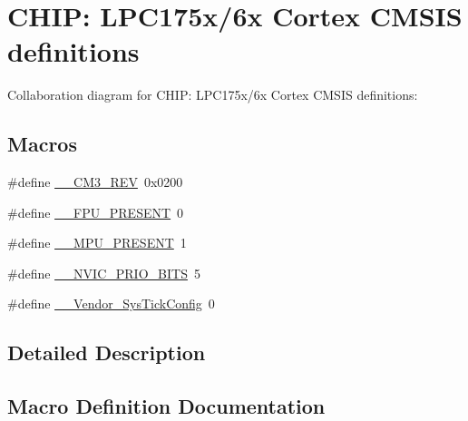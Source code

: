\hypertarget{group__CMSIS__175X__6X__COMMON}{}\section{C\+H\+IP\+: L\+P\+C175x/6x Cortex C\+M\+S\+IS definitions}
\label{group__CMSIS__175X__6X__COMMON}
Collaboration diagram for C\+H\+IP\+: L\+P\+C175x/6x Cortex C\+M\+S\+IS definitions\+:
\subsection*{Macros}
\begin{DoxyCompactItemize}
\item 
\#define \hyperlink{group__CMSIS__175X__6X__COMMON_gac6a3f185c4640e06443c18b3c8d93f53}{\+\_\+\+\_\+\+C\+M3\+\_\+\+R\+EV}~0x0200
\item 
\#define \hyperlink{group__CMSIS__175X__6X__COMMON_gac1ba8a48ca926bddc88be9bfd7d42641}{\+\_\+\+\_\+\+F\+P\+U\+\_\+\+P\+R\+E\+S\+E\+NT}~0
\item 
\#define \hyperlink{group__CMSIS__175X__6X__COMMON_ga4127d1b31aaf336fab3d7329d117f448}{\+\_\+\+\_\+\+M\+P\+U\+\_\+\+P\+R\+E\+S\+E\+NT}~1
\item 
\#define \hyperlink{group__CMSIS__175X__6X__COMMON_gae3fe3587d5100c787e02102ce3944460}{\+\_\+\+\_\+\+N\+V\+I\+C\+\_\+\+P\+R\+I\+O\+\_\+\+B\+I\+TS}~5
\item 
\#define \hyperlink{group__CMSIS__175X__6X__COMMON_gab58771b4ec03f9bdddc84770f7c95c68}{\+\_\+\+\_\+\+Vendor\+\_\+\+Sys\+Tick\+Config}~0
\end{DoxyCompactItemize}


\subsection{Detailed Description}


\subsection{Macro Definition Documentation}
